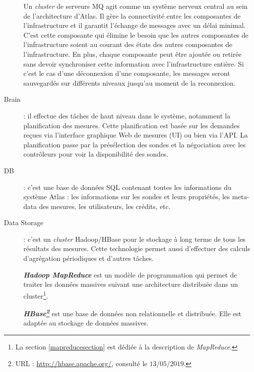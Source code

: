 \begin{description}
	Un \textit{cluster} de serveurs MQ  agit comme un système nerveux central au sein de l'architecture d'Atlas. Il gère la connectivité entre les composantes de l'infrastructure et  il garantit l'échange de messages avec un délai minimal. C'est cette composante qui élimine le besoin que les autres composantes de l'infrastructure soient au courant des états des autres composantes de l'infrastructure. En plus, chaque composante peut être ajoutée ou retirée sans devoir synchroniser cette information avec l'infrastructure entière. Si c'est le cas d'une déconnexion d'une composante, les messages seront sauvegardés sur différents niveaux jusqu'au moment de la reconnexion.
	
	


	
	\item [Brain] : il effectue des tâches de haut niveau dans le système, notamment la planification des mesures. Cette planification est basée sur les demandes reçues via l'interface graphique Web de mesures (UI) ou bien via l'API. La planification passe par la  présélection des sondes  et la négociation avec les contrôleurs pour voir la disponibilité des sondes. 
	
	
	\item [DB] : c'est une base de données SQL contenant toutes les informations du système  Atlas : les informations sur les sondes et leurs propriétés, les meta-data des mesures, les utilisateurs, les crédits, etc. 
	
	\item [Data Storage] : c'est un \textit{cluster} Hadoop/HBase pour le stockage à long terme de tous les résultats des mesures. Cette technologie permet aussi d'effectuer des calculs d'agrégation périodiques et  d'autres tâches. 
	
	
	\begin{tcolorbox}
		\textbf{\textit{Hadoop MapReduce}} est un modèle de programmation qui permet de traiter les données massives suivant une architecture distribuée dans un cluster\footnote{La section  \ref{mapreducesection} est dédiée à la description de \textit{MapReduce}.}.
		
		\textbf{ \textit{HBase\footnote{URL : \url{http://hbase.apache.org/}, consulté le $13/05/2019$.}}} est une base de données non relationnelle et distribuée. Elle est adaptée au stockage de données massives.
	\end{tcolorbox} 
	
\end{description}

